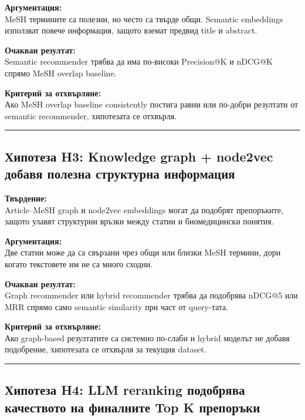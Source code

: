 \documentclass[12pt,a4paper]{article}
\begin{document}
\textbf{Аргументация:}\\
MeSH термините са полезни, но често са твърде общи. Semantic embeddings използват повече информация, защото вземат предвид title и abstract.

\textbf{Очакван резултат:}\\
Semantic recommender трябва да има по-високи Precision@K и nDCG@K спрямо MeSH overlap baseline.

\textbf{Критерий за отхвърляне:}\\
Ако MeSH overlap baseline consistently постига равни или по-добри резултати от semantic recommender, хипотезата се отхвърля.

\vspace{0.5em}\hrule\vspace{1.0em}

\subsection{Хипотеза H3: Knowledge graph + node2vec добавя полезна структурна информация}\label{ux445ux438ux43fux43eux442ux435ux437ux430-h3-knowledge-graph-node2vec-ux434ux43eux431ux430ux432ux44f-ux43fux43eux43bux435ux437ux43dux430-ux441ux442ux440ux443ux43aux442ux443ux440ux43dux430-ux438ux43dux444ux43eux440ux43cux430ux446ux438ux44f}

\textbf{Твърдение:}\\
Article--MeSH graph и node2vec embeddings могат да подобрят препоръките, защото улавят структурни връзки между статии и биомедицински понятия.

\textbf{Аргументация:}\\
Две статии може да са свързани чрез общи или близки MeSH термини, дори когато текстовете им не са много сходни.

\textbf{Очакван резултат:}\\
Graph recommender или hybrid recommender трябва да подобрява nDCG@5 или MRR спрямо само semantic similarity при част от query-тата.

\textbf{Критерий за отхвърляне:}\\
Ако graph-based резултатите са системно по-слаби и hybrid моделът не добавя подобрение, хипотезата се отхвърля за текущия dataset.

\vspace{0.5em}\hrule\vspace{1.0em}

\subsection{Хипотеза H4: LLM reranking подобрява качеството на финалните Top K препоръки}\label{ux445ux438ux43fux43eux442ux435ux437ux430-h4-llm-reranking-ux43fux43eux434ux43eux431ux440ux44fux432ux430-ux43aux430ux447ux435ux441ux442ux432ux43eux442ux43e-ux43dux430-ux444ux438ux43dux430ux43bux43dux438ux442ux435-top-k-ux43fux440ux435ux43fux43eux440ux44aux43aux438}
\end{document}
